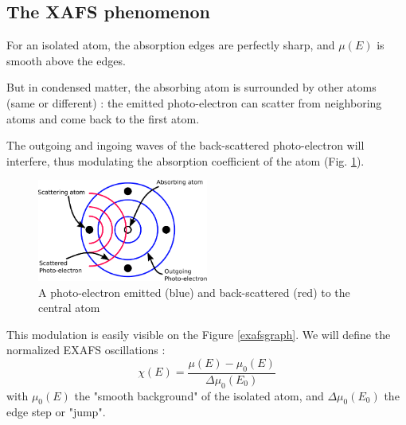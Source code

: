 \documentclass[11pt,a4paper,oneside]{report}
\begin{document}
\newpage
\subsection{The XAFS phenomenon}
For an isolated atom, the absorption edges are perfectly sharp, and $\mu(E)$ is smooth above the edges.

But in condensed matter, the absorbing atom is surrounded by other atoms (same or different) : the emitted photo-electron can scatter from neighboring atoms and come back to the first atom.

The outgoing and ingoing waves of the back-scattered photo-electron will interfere, thus modulating the absorption coefficient of the atom (Fig. \ref{scatteringschema}).
\begin{figure}[H]
    \begin{center}
        \includegraphics[width=0.5\textwidth]{Images/Scattering}
        \caption{A photo-electron emitted (blue) and back-scattered (red) to the central atom}
        \label{scatteringschema}
    \end{center}
\end{figure}

This modulation is easily visible on the Figure \ref{exafsgraph}. We will define the normalized EXAFS oscillations :
\[\chi(E) = \frac{\mu(E) - \mu_0(E)}{\Delta\mu_0(E_0)}\]
with $\mu_0(E)$ the "smooth background" of the isolated atom, and $\Delta\mu_0(E_0)$ the edge step or "jump".
\end{document}

